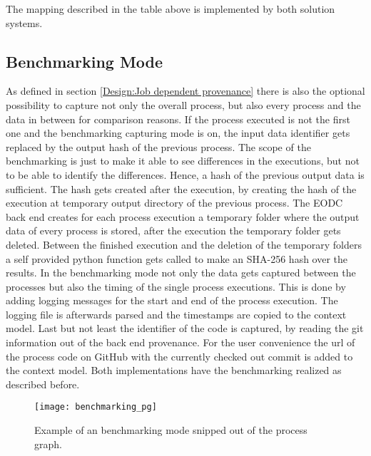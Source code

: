 \documentclass[draft,final]{vutinfth} %
\begin{document}
The mapping described in the table above is implemented by both solution systems. 

\subsection{Benchmarking Mode}\label{Implementation:Benchmarking Mode}
As defined in section \ref{Design:Job dependent provenance} there is also the optional possibility to capture not only the overall process, but also every process and the data in between for comparison reasons. 
If the process executed is not the first one and the benchmarking capturing mode is on, the input data identifier gets replaced by the output hash of the previous process. The scope of the benchmarking is just to make it able to see differences in the executions, but not to be able to identify the differences. Hence, a hash of the previous output data is sufficient. The hash gets created after the execution, by creating the hash of the execution at temporary output directory of the previous process. The EODC back end creates for each process execution a temporary folder where the output data of every process is stored, after the execution the temporary folder gets deleted. Between the finished execution and the deletion of the temporary folders a self provided python function gets called to make an SHA-256 hash over the results. In the benchmarking mode not only the data gets captured between the processes but also the timing of the single process executions. This is done by adding logging messages for the start and end of the process execution. The logging file is afterwards parsed and the timestamps are copied to the context model. Last but not least the identifier of the code is captured, by reading the git information out of the back end provenance. For the user convenience the url of the process code on GitHub with the currently checked out commit is added to the context model. Both implementations have the benchmarking realized as described before.    

\begin{figure}[h]
	\centering
	\texttt{[image: benchmarking\_pg]}
	\caption{Example of an benchmarking mode snipped out of the process graph.}
	\label{fig:benchmarking_pg} %
\end{figure}
\end{document}
